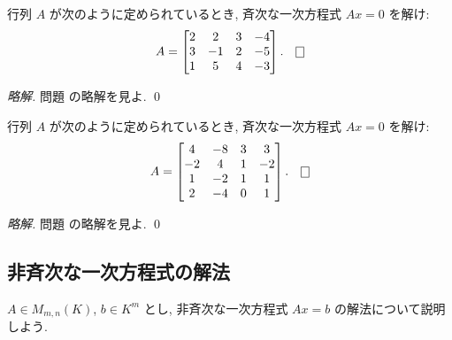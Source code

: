 \documentclass[12pt,twoside]{jarticle}
\newcommand\commentout[1]{#1}
\newcommand\commentout[1]{}
\begin{document}

\begin{question}
  \label{q:sol-hom-2}
  行列 $A$ が次のように定められているとき, 
  斉次な一次方程式 $Ax=0$ を解け:
  \begin{equation*}
    A = 
    \begin{bmatrix}
      2 &  2 & 3 & -4 \\
      3 & -1 & 2 & -5 \\
      1 &  5 & 4 & -3 \\
    \end{bmatrix}.
    \qed
  \end{equation*}
\end{question}

\commentout{
\begin{proof}[略解]
  問題  の略解を見よ. \qed
\end{proof}
}


\begin{question}
  \label{q:sol-hom-3}
  行列 $A$ が次のように定められているとき, 
  斉次な一次方程式 $Ax=0$ を解け:
  \begin{equation*}
    A = 
    \begin{bmatrix}
       4 & -8 & 3 &  3 \\
      -2 &  4 & 1 & -2 \\
       1 & -2 & 1 &  1 \\
       2 & -4 & 0 &  1 \\
    \end{bmatrix}.
    \qed
  \end{equation*}
\end{question}

\commentout{
\begin{proof}[略解]
  問題  の略解を見よ. \qed
\end{proof}
}


\subsection{非斉次な一次方程式の解法}
\label{sec:sol-inhom-lin-eq}

$A\in M_{m,n}(K)$, $b\in K^m$ とし, 
非斉次な一次方程式 $Ax=b$ の解法について説明しよう.
\end{document}
